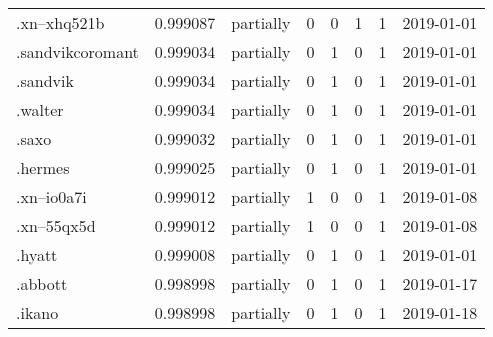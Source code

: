 \begin{tabular}{lrlrrrrl}
.xn--xhq521b              &          0.999087 &       partially &                           0 &                           0 &                           1 &                   1 &           2019-01-01 \\
.sandvikcoromant          &          0.999034 &       partially &                           0 &                           1 &                           0 &                   1 &           2019-01-01 \\
.sandvik                  &          0.999034 &       partially &                           0 &                           1 &                           0 &                   1 &           2019-01-01 \\
.walter                   &          0.999034 &       partially &                           0 &                           1 &                           0 &                   1 &           2019-01-01 \\
.saxo                     &          0.999032 &       partially &                           0 &                           1 &                           0 &                   1 &           2019-01-01 \\
.hermes                   &          0.999025 &       partially &                           0 &                           1 &                           0 &                   1 &           2019-01-01 \\
.xn--io0a7i               &          0.999012 &       partially &                           1 &                           0 &                           0 &                   1 &           2019-01-08 \\
.xn--55qx5d               &          0.999012 &       partially &                           1 &                           0 &                           0 &                   1 &           2019-01-08 \\
.hyatt                    &          0.999008 &       partially &                           0 &                           1 &                           0 &                   1 &           2019-01-01 \\
.abbott                   &          0.998998 &       partially &                           0 &                           1 &                           0 &                   1 &           2019-01-17 \\
.ikano                    &          0.998998 &       partially &                           0 &                           1 &                           0 &                   1 &           2019-01-18 \\

\end{tabular}
